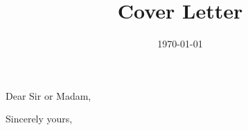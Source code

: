 \documentclass[11pt,a4paper,sans]{moderncv} %
\title{Cover Letter}
\begin{document}
\date{\today} %
\opening{Dear Sir or Madam,} %
\closing{Sincerely yours,} %
\makelettertitle %

\lipsum[1-3] %

\makeletterclosing %

\end{document}
